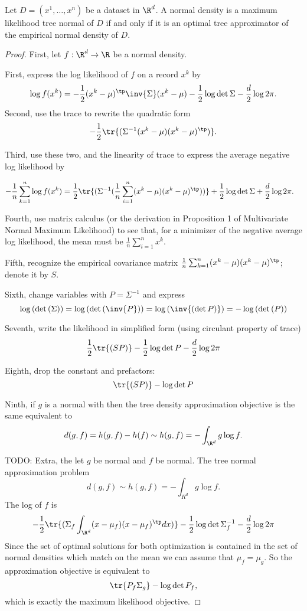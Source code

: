 \begin{proposition}
Let $D = (x^1, \dots , x^n)$ be a dataset in $\R ^d$.
A normal density is a maximum likelihood tree normal of $D$ if and only if it is an optimal tree approximator of the empirical normal density of $D$.

\begin{proof}First, let $f: \R ^d \to \R $ be a normal density.

First, express the log likelihood of $f$ on a record $x^k$ by
    \[
\log f(x^k) = - \frac{1}{2} (x^k - \mu )^{\tp} \inv{\Sigma } (x^k - \mu ) - \frac{1}{2} \log \det \Sigma  - \frac{d}{2}\log 2\pi .
    \]
Second, use the trace to rewrite the quadratic form
    \[
-\frac{1}{2}\tr{(\Sigma ^{-1} (x^k - \mu ) (x^k - \mu )^{\tp})}.
    \]

Third, use these two, and the linearity of trace to express the average negative log likelihood by

    \[
\begin{aligned}
- \frac{1}{n} \sum_{k = 1}^{n} \log f(x^k) &= \frac{1}{2} \tr{(\Sigma ^{-1}(\frac{1}{n}\sum_{i = 1}^{n} (x^k - \mu )(x^k - \mu )^{\tp}))} + \frac{1}{2}\log\det\Sigma  + \frac{d}{2}\log 2\pi .
\end{aligned}
    \]

Fourth, use matrix calculus (or the derivation in Proposition 1 of Multivariate Normal Maximum Likelihood) to see that, for a minimizer of the negative average log likelihood, the mean must be $\frac{1}{n} \sum_{i = 1}^{n} x^k$.

Fifth, recognize the empirical covariance matrix $\frac{1}{n}\sum_{k = 1}^{n} (x^k - \mu )(x^k - \mu )^{\tp}$; denote it by $S$.

Sixth, change variables with $P = \Sigma ^{-1}$ and express
    \[
\log{(\det{(\Sigma )})} = \log{(\det{(\inv{P})})} = \log{(\inv{(\det P)})} = -\log{(\det{(P)})}
    \]

Seventh, write the likelihood in simplified form (using circulant property of trace)
    \[
\frac{1}{2} \tr{(SP)} - \frac{1}{2} \log \det P - \frac{d}{2}\log 2\pi
    \]

Eighth, drop the constant and prefactors:
    \[
\tr{(SP)} - \log \det P
    \]

Ninth, if $g$ is a normal with then the tree density approximation objective is the same equivalent to
    \[
d(g, f) = h(g, f) - h(f) \sim h(g, f) = - \int_{\R ^d} g\log f.
    \]

TODO:
Extra, the let $g$ be normal and $f$ be normal. The tree normal approximation problem
    \[
d(g, f) \sim h(g, f) = - \int_{R^d} g \log f.
    \]
The log of $f$ is
      \[
- \frac{1}{2} \tr{( \Sigma _f \int_{\R ^d} (x - \mu _f)(x - \mu _f)^{\tp} dx )} - \frac{1}{2} \log \det \Sigma _f^{-1} - \frac{d}{2} \log 2\pi
      \]
Since the set of optimal solutions for both optimization is contained in the set of normal densities which match on the mean we can assume that $\mu _f = \mu _g$.
So the approximation objective is equivalent to
      \[
\tr{P_f \Sigma _g} - \log \det P_f,
      \]
which is exactly the maximum likelihood objective.


\end{proof}
\end{proposition}
